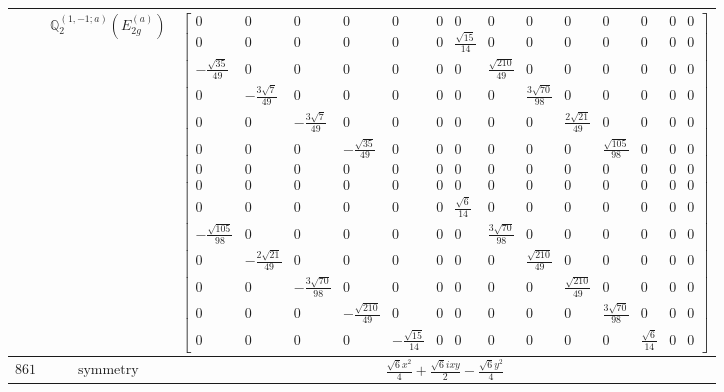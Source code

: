 \documentclass[fleqn,8pt,landscape]{jsarticle}
\begin{document}
\begin{longtable}{ccc}
$  $ & $ \mathbb{Q}_{2}^{(1,-1;a)}(E_{2g}^{(a)}) $ & $ \begin{bmatrix} 0 & 0 & 0 & 0 & 0 & 0 & 0 & 0 & 0 & 0 & 0 & 0 & 0 & 0 \\ 0 & 0 & 0 & 0 & 0 & 0 & \frac{\sqrt{15}}{14} & 0 & 0 & 0 & 0 & 0 & 0 & 0 \\ - \frac{\sqrt{35}}{49} & 0 & 0 & 0 & 0 & 0 & 0 & \frac{\sqrt{210}}{49} & 0 & 0 & 0 & 0 & 0 & 0 \\ 0 & - \frac{3 \sqrt{7}}{49} & 0 & 0 & 0 & 0 & 0 & 0 & \frac{3 \sqrt{70}}{98} & 0 & 0 & 0 & 0 & 0 \\ 0 & 0 & - \frac{3 \sqrt{7}}{49} & 0 & 0 & 0 & 0 & 0 & 0 & \frac{2 \sqrt{21}}{49} & 0 & 0 & 0 & 0 \\ 0 & 0 & 0 & - \frac{\sqrt{35}}{49} & 0 & 0 & 0 & 0 & 0 & 0 & \frac{\sqrt{105}}{98} & 0 & 0 & 0 \\ 0 & 0 & 0 & 0 & 0 & 0 & 0 & 0 & 0 & 0 & 0 & 0 & 0 & 0 \\ 0 & 0 & 0 & 0 & 0 & 0 & 0 & 0 & 0 & 0 & 0 & 0 & 0 & 0 \\ 0 & 0 & 0 & 0 & 0 & 0 & \frac{\sqrt{6}}{14} & 0 & 0 & 0 & 0 & 0 & 0 & 0 \\ - \frac{\sqrt{105}}{98} & 0 & 0 & 0 & 0 & 0 & 0 & \frac{3 \sqrt{70}}{98} & 0 & 0 & 0 & 0 & 0 & 0 \\ 0 & - \frac{2 \sqrt{21}}{49} & 0 & 0 & 0 & 0 & 0 & 0 & \frac{\sqrt{210}}{49} & 0 & 0 & 0 & 0 & 0 \\ 0 & 0 & - \frac{3 \sqrt{70}}{98} & 0 & 0 & 0 & 0 & 0 & 0 & \frac{\sqrt{210}}{49} & 0 & 0 & 0 & 0 \\ 0 & 0 & 0 & - \frac{\sqrt{210}}{49} & 0 & 0 & 0 & 0 & 0 & 0 & \frac{3 \sqrt{70}}{98} & 0 & 0 & 0 \\ 0 & 0 & 0 & 0 & - \frac{\sqrt{15}}{14} & 0 & 0 & 0 & 0 & 0 & 0 & \frac{\sqrt{6}}{14} & 0 & 0 \end{bmatrix} $ \\ \hline
$ 861 $ & $ \text{symmetry} $ & $ \frac{\sqrt{6} x^{2}}{4} + \frac{\sqrt{6} i x y}{2} - \frac{\sqrt{6} y^{2}}{4} $ \\

\end{longtable}
\end{document}
